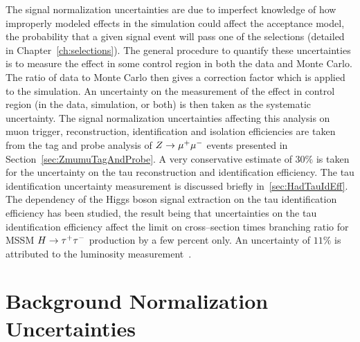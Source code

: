 The signal normalization uncertainties are due to imperfect knowledge of how
improperly modeled effects in the simulation could affect the acceptance model,
the probability that a given signal event will pass one of the selections
(detailed in Chapter~\ref{ch:selections}).  The general procedure to quantify
these uncertainties is to measure the effect in some control region in both the
data and Monte Carlo.  The ratio of data to Monte Carlo then gives a correction
factor which is applied to the simulation.  An uncertainty on the measurement of
the effect in control region (in the data, simulation, or both) is then taken as the
systematic uncertainty.  The signal normalization uncertainties affecting this
analysis on muon trigger, reconstruction, identification and isolation
efficiencies are taken from the tag and probe analysis of $Z \to \mu^+\mu^-$ events
presented in Section~\ref{sec:ZmumuTagAndProbe}.  A very conservative estimate
of $30\%$ is taken for the uncertainty on the tau reconstruction and
identification efficiency.  The tau identification uncertainty measurement is
discussed briefly in~\ref{sec:HadTauIdEff}.  The dependency of the Higgs boson signal
extraction on the tau identification efficiency has been studied, the result
being that uncertainties on the tau identification efficiency affect the limit
on cross--section times branching ratio for MSSM $H \to \tau^+\tau^-$ production by a
few percent only.  An uncertainty of $11\%$ is attributed to the luminosity
measurement~\cite{LUMI}.

\section{Background Normalization Uncertainties}

